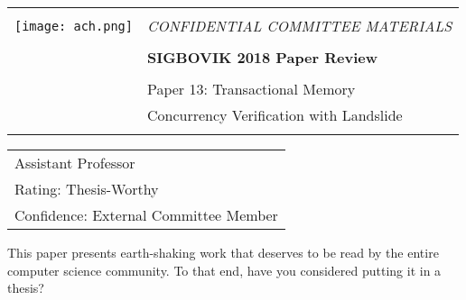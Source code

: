 \documentclass[12pt]{article}
\begin{document}
{\sffamily
\begin{tabular}{ll}
\multirow{3}{*}{\texttt{[image: ach.png]}}\\
& \Large{\em CONFIDENTIAL COMMITTEE MATERIALS} \\
&\\
& \textbf{\Huge{SIGBOVIK 2018 Paper Review}} \\
&\\
& \LARGE{Paper 13: Transactional Memory} \\[0.25em]
& \LARGE{Concurrency Verification with Landslide} \\
&\\
\hline
\end{tabular}}
\vspace{2em}
\thispagestyle{empty}

{\large\bf
\begin{tabular}{l}
Assistant Professor \\
Rating: Thesis-Worthy \\
Confidence: External Committee Member \\
\end{tabular}}
\vspace{1em}

This paper presents earth-shaking work
that deserves to be read by the entire computer science community.
To that end, have you considered putting it in a thesis?
\end{document}

